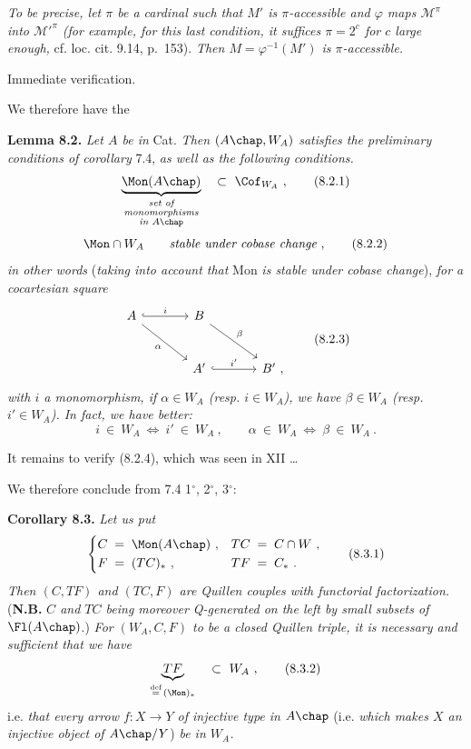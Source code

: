 \textit{To be precise, let $\pi$ be a cardinal such that $M'$ is $\pi$-accessible and $\varphi$ maps $\mathcal{M}^{\pi}$ into $\mathcal{M}'^{\pi}$ (for example, for this last condition, it suffices $\pi=2^c$ for $c$ large enough,} cf. loc. cit. 9.14, p.~153). \textit{Then $M=\varphi^{-1}(M')$ is $\pi$-accessible.}

Immediate verification.

We therefore have the

\textbf{Lemma 8.2.} \textit{Let $A$ be in} Cat. \textit{Then $(A\chap,W_A)$ satisfies the preliminary conditions of corollary} 7.4, \textit{as well as the following conditions.}
\[
\underbrace{\Mon(A\chap)}_{\substack{\textit{set of}\\ \textit{monomorphisms}\\ \textit{in } A\chap}} \quad\subset\ \Cof_{W_A}\ ,
\tag*{(8.2.1)}
\]
\[
\Mon\cap W_A \qquad \textit{stable under cobase change}\ ,
\tag*{(8.2.2)}
\]
\textit{in other words} (\textit{taking into account that} Mon \textit{is stable under cobase change}), \textit{for a cocartesian square}
\[
\begin{tikzcd}[row sep=large, column sep=large]
A \arrow[r, hook, "i"] \arrow[dr, "\alpha"'] & B \arrow[dr, "\beta"] & \\
& A' \arrow[r, hook, "i'"] & B'\ ,
\end{tikzcd}
\tag*{(8.2.3)}
\]
\textit{with $i$ a monomorphism, if $\alpha\in W_A$ (resp. $i\in W_A$), we have $\beta\in W_A$ (resp. $i'\in W_A$). In fact, we have better:}
\[
i\ \in\ W_A \ \Longleftrightarrow\ i'\ \in\ W_A\ , \qquad \alpha\ \in\ W_A \ \Longleftrightarrow\ \beta\ \in\ W_A\ .
\tag*{(8.2.4)}
\]

It remains to verify (8.2.4), which was seen in XII \ldots

We therefore conclude from 7.4 1$^\circ$, 2$^\circ$, 3$^\circ$:

\textbf{Corollary 8.3.} \textit{Let us put}
\[
\left\{
\begin{aligned}
C \;&=\; \Mon(A\chap)\ , & TC \;&=\; C\cap W\ ,\\
F \;&=\; (TC)_*\ , & TF \;&=\; C_*\ .
\end{aligned}
\right.
\tag*{(8.3.1)}
\]
\textit{Then $(C,TF)$ and $(TC,F)$ are Quillen couples with functorial factorization.} (\textbf{N.B.} \textit{$C$ and $TC$ being moreover Q-generated on the left by small subsets of} $\Fl(A\chap)$.) \textit{For $(W_A,C,F)$ to be a closed Quillen triple, it is necessary and sufficient that we have}
\[
\underbrace{TF}_{\overset{\text{def}}{=}\,(\Mon)_*} \quad\subset\ W_A\ ,
\tag*{(8.3.2)}
\]
i.e. \textit{that every arrow $f:X\longrightarrow Y$ of injective type in $A\chap$} (i.e. \textit{which makes $X$ an injective object of $A\chap/Y$}) \textit{be in $W_A$.}

